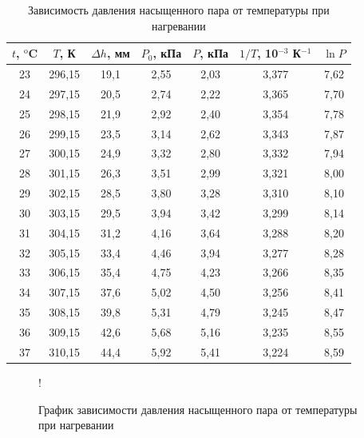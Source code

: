 \documentclass[a4paper,12pt]{article} %
\begin{document}
\begin{table}[]
    \centering
    \begin{tabular}{|c|c|c|c|c|c|c|}\hline
        $t$, $^\text{o}$C & $T$, К & $\Delta h$, мм & $P_0$, кПа & $P$, кПа & $1/T$, 10$^{-3}$ К$^{-1}$ & $\ln P$ \\ \hline
        23 & 296,15 & 19,1 & 2,55 & 2,03 & 3,377 & 7,62 \\ \hline
        24 & 297,15 & 20,5 & 2,74 & 2,22 & 3,365 & 7,70 \\ \hline
        25 & 298,15 & 21,9 & 2,92 & 2,40 & 3,354 & 7,78 \\ \hline
        26 & 299,15 & 23,5 & 3,14 & 2,62 & 3,343 & 7,87 \\ \hline
        27 & 300,15 & 24,9 & 3,32 & 2,80 & 3,332 & 7,94 \\ \hline
        28 & 301,15 & 26,3 & 3,51 & 2,99 & 3,321 & 8,00 \\ \hline
        29 & 302,15 & 28,5 & 3,80 & 3,28 & 3,310 & 8,10 \\ \hline
        30 & 303,15 & 29,5 & 3,94 & 3,42 & 3,299 & 8,14 \\ \hline
        31 & 304,15 & 31,2 & 4,16 & 3,64 & 3,288 & 8,20 \\ \hline
        32 & 305,15 & 33,4 & 4,46 & 3,94 & 3,277 & 8,28 \\ \hline
        33 & 306,15 & 35,4 & 4,75 & 4,23 & 3,266 & 8,35 \\ \hline
        34 & 307,15 & 37,6 & 5,02 & 4,50 & 3,256 & 8,41 \\ \hline
        35 & 308,15 & 39,8 & 5,31 & 4,79 & 3,245 & 8,47 \\ \hline
        36 & 309,15 & 42,6 & 5,68 & 5,16 & 3,235 & 8,55 \\ \hline
        37 & 310,15 & 44,4 & 5,92 & 5,41 & 3,224 & 8,59 \\ \hline
        \end{tabular}
    \caption{Зависимость давления насыщенного пара от температуры при нагревании}
    \label{tab:heating}
\end{table}

\begin{figure}
\centering
{} {!} {
}
\caption{График зависимости давления насыщенного пара от температуры при нагревании}
\label{graph:heating}
\end{figure}
\end{document}
